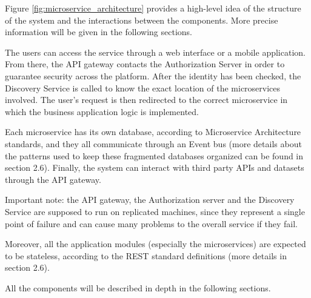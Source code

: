Figure \ref{fig:microservice_architecture} provides a high-level idea of the structure of the system and the interactions between the components. More precise information will be given in the following sections.

The users can access the service through a web interface or a mobile application. From there, the API gateway contacts the Authorization Server in order to guarantee security across the platform. After the identity has been checked, the Discovery Service is called to know the exact location of the microservices involved. The user’s request is then redirected to the correct microservice in which the business application logic is implemented. 

Each microservice has its own database, according to Microservice Architecture standards, and they all communicate through an Event bus (more details about the patterns used to keep these fragmented databases organized can be found in section 2.6). Finally, the system can interact with third party APIs and datasets through the API gateway.
\newline

Important note: the API gateway, the Authorization server and the Discovery Service are supposed to run on replicated machines, since they represent a single point of failure and can cause many problems to the overall service if they fail.

Moreover, all the application modules (especially the microservices) are expected to be stateless, according to the REST standard definitions (more details in section 2.6).

All the components will be described in depth in the following sections.
